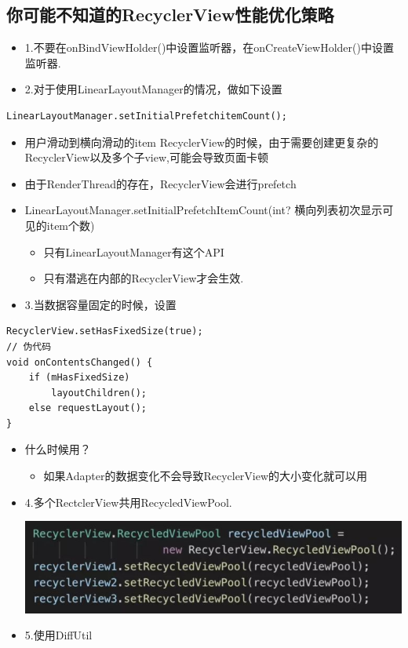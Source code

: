 \documentclass[9pt, b5paper]{article}
\begin{document}
\subsection{你可能不知道的RecyclerView性能优化策略}
\label{sec-5-5}
\begin{itemize}
\item 1.不要在onBindViewHolder()中设置监听器，在onCreateViewHolder()中设置监听器.
\item 2.对于使用LinearLayoutManager的情况，做如下设置
\end{itemize}
\begin{verbatim}
LinearLayoutManager.setInitialPrefetchitemCount();
\end{verbatim}
\begin{itemize}
\item 用户滑动到横向滑动的item RecyclerView的时候，由于需要创建更复杂的RecyclerView以及多个子view,可能会导致页面卡顿
\item 由于RenderThread的存在，RecyclerView会进行prefetch
\item LinearLayoutManager.setInitialPrefetchItemCount(int? 横向列表初次显示可见的item个数)
\begin{itemize}
\item 只有LinearLayoutManager有这个API
\item 只有潜逃在内部的RecyclerView才会生效.
\end{itemize}
\item 3.当数据容量固定的时候，设置
\end{itemize}
\begin{verbatim}
RecyclerView.setHasFixedSize(true);
// 伪代码
void onContentsChanged() {
    if (mHasFixedSize) 
        layoutChildren();
    else requestLayout();
}
\end{verbatim}
\begin{itemize}
\item 什么时候用？
\begin{itemize}
\item 如果Adapter的数据变化不会导致RecyclerView的大小变化就可以用
\end{itemize}
\item 4.多个RectclerView共用RecycledViewPool.

\includegraphics[width=.9\linewidth]{./pic/viewpool.jpg}
\item 5.使用DiffUtil
\end{itemize}
\end{document}
